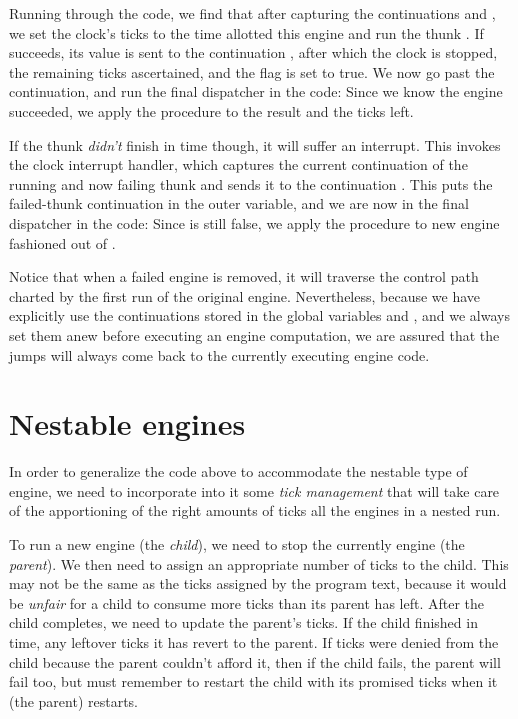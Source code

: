 Running through the code, we find that after capturing
the continuations  and
, we set the clock's ticks to the
time allotted this engine and run the thunk .  If
 succeeds, its value  is sent to the
continuation , after which the
clock is stopped, the remaining ticks ascertained, and
the flag  is set to true.  We now
go past the  continuation, and run
the final dispatcher in the code: Since we know the
engine succeeded, we apply the  procedure to
the result and the ticks left.

If the thunk  {\em didn't} finish in time
though, it will suffer an interrupt.  This invokes the
clock interrupt handler, which captures the current
continuation of the running and now failing thunk and
sends it to the continuation .  This
puts the failed-thunk continuation in the outer
 variable, and we are now in the final
dispatcher in the code: Since  is
still false, we apply the  procedure to new
engine fashioned out of .

Notice that when a failed engine is removed, it will
traverse the control path charted by the first run of
the original engine.  Nevertheless, because we have
explicitly use the continuations stored in the global
variables  and
, and we always set them anew before
executing an engine computation, we are assured that
the jumps will always come back to the currently
executing engine code.

\section{Nestable engines}

In order to generalize the code above to accommodate
the nestable type of engine, we need to incorporate
into it some {\em tick management} that will take
care of the apportioning of the right amounts of ticks
all the engines in a nested run.

To run a new engine (the {\em child}), we need to
stop the currently engine (the {\em parent}).  We
then need to assign an appropriate number of ticks to
the child.  This may not be the same as the ticks
assigned by the program text, because it would be {\em
unfair} for a child to consume more ticks than its
parent has left.  After the child completes, we need to
update the parent's ticks.  If the child finished in
time, any leftover ticks it has revert to the parent.
If ticks were denied from the child because the parent
couldn't afford it, then if the child fails, the parent
will fail too, but must remember to restart the child
with its promised ticks when it (the parent) restarts.

